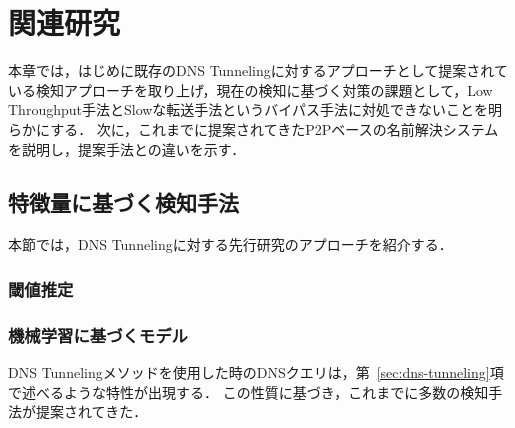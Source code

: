 \section{関連研究}
\label{sec:related-works}
本章では，はじめに既存のDNS Tunnelingに対するアプローチとして提案されている検知アプローチを取り上げ，現在の検知に基づく対策の課題として，Low Throughput手法とSlowな転送手法というバイパス手法に対処できないことを明らかにする．
次に，これまでに提案されてきたP2Pベースの名前解決システムを説明し，提案手法との違いを示す．

\subsection{特徴量に基づく検知手法}
本節では，DNS Tunnelingに対する先行研究のアプローチを紹介する．
\subsubsection{閾値推定}
\subsubsection{機械学習に基づくモデル}
DNS Tunnelingメソッドを使用した時のDNSクエリは，第~\ref{sec:dns-tunneling}項で述べるような特性が出現する．
この性質に基づき，これまでに多数の検知手法が提案されてきた．

